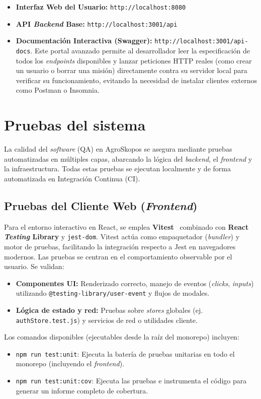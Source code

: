 \begin{itemize}
    \item \textbf{Interfaz Web del Usuario:} \texttt{http://localhost:8080}
    \item \textbf{API \textit{Backend} Base:} \texttt{http://localhost:3001/api}
    \item \textbf{Documentación Interactiva (Swagger):} \texttt{http://localhost:3001/api-docs}. Este portal avanzado permite al desarrollador leer la especificación de todos los \textit{endpoints} disponibles y lanzar peticiones HTTP reales (como crear un usuario o borrar una misión) directamente contra su servidor local para verificar su funcionamiento, evitando la necesidad de instalar clientes externos como Postman o Insomnia.
\end{itemize}
\section{Pruebas del sistema}

La calidad del \textit{software} (QA) en AgroSkopos se asegura mediante pruebas automatizadas en múltiples capas, abarcando la lógica del \textit{backend}, el \textit{frontend} y la infraestructura. Todas estas pruebas se ejecutan localmente y de forma automatizada en Integración Continua (CI).

\subsection{Pruebas del Cliente Web (\textit{Frontend})}
Para el entorno interactivo en React, se emplea \textbf{Vitest}~\cite{vitest} combinado con \textbf{React \textit{Testing} Library} y \texttt{jest-dom}. Vitest actúa como empaquetador (\textit{bundler}) y motor de pruebas, facilitando la integración respecto a Jest en navegadores modernos.
Las pruebas se centran en el comportamiento observable por el usuario. Se validan:
\begin{itemize}
    \item \textbf{Componentes UI:} Renderizado correcto, manejo de eventos (\textit{clicks}, \textit{inputs}) utilizando \texttt{@testing-library/user-event} y flujos de modales.
    \item \textbf{Lógica de estado y red:} Pruebas sobre \textit{stores} globales (ej. \texttt{authStore.test.js}) y servicios de red o utilidades cliente.
\end{itemize}

Los comandos disponibles (ejecutables desde la raíz del monorepo) incluyen:
\begin{itemize}
    \item \texttt{npm run test:unit}: Ejecuta la batería de pruebas unitarias en todo el monorepo (incluyendo el \textit{frontend}).
    \item \texttt{npm run test:unit:cov}: Ejecuta las pruebas e instrumenta el código para generar un informe completo de cobertura.
\end{itemize}

